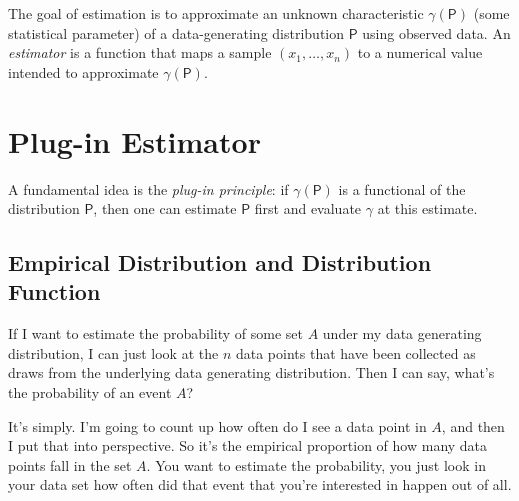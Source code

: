 The goal of estimation is to approximate an unknown characteristic $\gamma(\mathsf P)$ (some statistical parameter) of a data-generating
distribution $\mathsf P$ using observed data. An \emph{estimator} is a function that maps a sample
$(x_1,\dots,x_n)$ to a numerical value intended to approximate $\gamma(\mathsf P)$.

 \section{Plug-in Estimator}%
 \label{sub:Plug-in Estimator}
 

A fundamental idea is the \emph{plug-in principle}: if $\gamma(\mathsf P)$ is a functional of the
distribution $\mathsf P$, then one can estimate $\mathsf{P}$ first and evaluate $\gamma$ at this estimate.

 \subsection{Empirical Distribution and Distribution Function}%
 \label{ssub:Empirical Distribution and Distribution Function}


 If I want to estimate the probability of some set \(A\) under my data generating distribution, I can just look at the \(n\)
 data points that have been collected as draws from the underlying data generating distribution.
 Then I can say, what's the probability of an event \(A\)?

 It's simply. I'm going to count up how often do I see a data point in \(A\), and then
 I put that into perspective. 
 So it's the empirical proportion of how many data points fall in the set \(A\).
 You want to estimate the probability, you just look in your data set how often did that
 event that you're interested in happen out of all.

